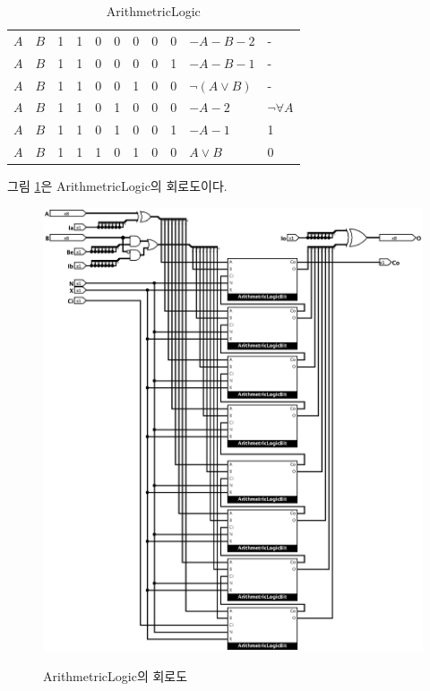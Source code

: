 \documentclass{article}
\renewcommand{\figurename}{그림}
\begin{document}
\begin{table}[p]
\begin{tabular}{cc|ccccccc|ll}
        $A$ & $B$ & 1 & 1 & 0 & 0 & 0 & 0 & 0 & $-A-B-2$ & - \\
        $A$ & $B$ & 1 & 1 & 0 & 0 & 0 & 0 & 1 & $-A-B-1$ & - \\
        $A$ & $B$ & 1 & 1 & 0 & 0 & 1 & 0 & 0 & $\neg(A \vee B)$ & - \\
        $A$ & $B$ & 1 & 1 & 0 & 1 & 0 & 0 & 0 & $-A-2$ & $\neg \forall A$ \\
        $A$ & $B$ & 1 & 1 & 0 & 1 & 0 & 0 & 1 & $-A-1$ & 1 \\
        $A$ & $B$ & 1 & 1 & 1 & 0 & 1 & 0 & 0 & $A \vee B$ & 0 \\
    \end{tabular}
    \caption{ArithmetricLogic}
    \label{tab:al}
\end{table}

\figurename{} \ref{fig:al}은 ArithmetricLogic의 회로도이다.

\begin{figure}[p]
    \centering
    \includegraphics[scale=0.35]{ArithmetricLogic} \\
    \caption{ArithmetricLogic의 회로도}
    \label{fig:al}
\end{figure}
\end{document}
